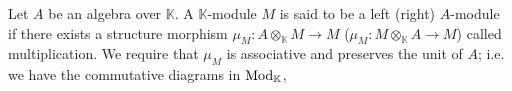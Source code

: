 \documentclass[../thesis.tex]{subfiles}
\begin{document}
                \begin{definition}[Modules]
                    Let $A$ be an algebra over $\mathbb{K}$. A $\mathbb{K}$-module $M$ is said to be a left (right) $A$-module if there exists a structure morphism $\mu_M : A\otimes_{\mathbb{K}}M \rightarrow M$ ($\mu_M : M\otimes_{\mathbb{K}}A \rightarrow M$) called multiplication. We require that $\mu_M$ is associative and preserves the unit of $A$; i.e. we have the commutative diagrams in $\tt{Mod}_\mathbb{K}$,
                    \begin{center}
                    \end{center}
                            


                            

\end{definition}
\end{document}
